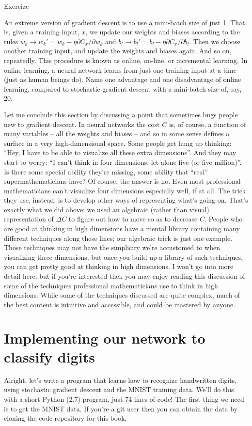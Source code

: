 \documentclass[a4paper,twoside,10pt]{book}
\begin{document}
\begin{exercize}{Exercize}
	\item An extreme version of gradient descent is to use a mini-batch size of just 1. That is, given a training input, $x$, we update our weights and biases according to the rules $w_k \to w_k' = w_k - \eta \partial C_x / \partial w_k$ and $b_l \to b_l' =	b_l - \eta \partial C_x / \partial b_l$. Then we choose another training input, and update the weights and biases again. And so on, repeatedly. This procedure is known as online, on-line, or incremental learning. In online learning, a neural network learns from just one training input at a time (just as human beings do). Name one advantage and one disadvantage of online learning, compared to stochastic gradient descent with a mini-batch size of, say, 20.
\end{exercize}
Let me conclude this section by discussing a point that sometimes bugs people new to gradient descent. In neural networks the cost $C$ is, of course, a function of many variables -- all the weights and biases -- and so in some sense defines a surface in a very high-dimensional space. Some people get hung up thinking: ``Hey, I have to be able to visualize all these extra dimensions''. And they may start to worry: ``I can't think in four dimensions, let alone five (or five million)''. Is there some special ability they're missing, some ability that ``real'' supermathematicians have? Of course, the answer is no. Even most professional mathematicians can't visualize four dimensions especially well, if at all. The trick they use, instead, is to develop other ways of representing what's going on. That's exactly what we did above: we used an algebraic (rather than visual) representation of $\Delta C$ to figure out how to move so as to decrease $C$. People who are good at thinking in high dimensions have a mental library containing many different techniques along these lines; our algebraic trick is just one example. Those techniques may not have the simplicity we're accustomed to when visualizing three dimensions, but once you build up a library of such techniques, you can get pretty good at thinking in high dimensions. I won't go into more detail here, but if you're interested then you may enjoy reading this discussion of some of the techniques professional mathematicians use to think in high dimensions. While some of the techniques discussed are quite complex, much of the best content is intuitive and accessible, and could be mastered by anyone.

\section{Implementing our network to classify digits}
\label{sec:1.7}
Alright, let's write a program that learns how to recognize handwritten digits, using stochastic gradient descent and the MNIST training data. We'll do this with a short Python (2.7) program, just 74 lines of code! The first thing we need is to get the MNIST data. If you're a git user then you can obtain the data by cloning the code repository for this book,
\end{document}
